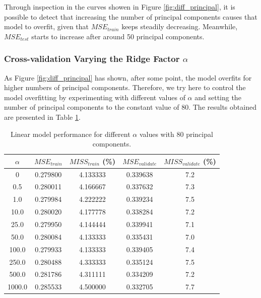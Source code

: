 \documentclass{article}
\begin{document}
Through inspection in the curves showen in Figure \ref{fig:diff_principal}, it is possible to detect that increasing the number of principal components causes that model to overfit, given that $MSE_{train}$ keeps steadily decreasing.  Meanwhile, $MSE_{test}$ starts to increase after around 50 principal components.

\subsubsection{Cross-validation Varying the Ridge Factor $\alpha$}

As Figure \ref{fig:diff_principal} has shown, after some point, the model overfits for higher numbers of principal components. Therefore, we try here to control the model overfitting by experimenting with different values of $\alpha$ and setting the number of principal components to the constant value of 80. The results obtained are presented in Table \ref{table:diff_pc_alpha}.

\begin{table}[h!]
\begin{center}
 \begin{tabular}{||c | c | c | c | c||} 
 \hline
 $\alpha$ & $MSE_{train}$ & $MISS_{train}$ (\%) & $MSE_{validate}$ & $MISS_{validate}$ (\%) \\ [0.5ex]
 \hline\hline
 0 & 0.279800 & 4.133333 & 0.339638 & 7.2\\ 
 \hline
 0.5 & 0.280011 & 4.166667 & 0.337632 & 7.3\\
 \hline
 1.0 & 0.279984 & 4.222222 & 0.339234 & 7.5\\
 \hline
 10.0 & 0.280020 & 4.177778 & 0.338284 & 7.2\\
 \hline
 25.0 & 0.279950 & 4.144444 & 0.339941 & 7.1\\
 \hline
  50.0 & 0.280084 & 4.133333 & 0.335431 & 7.0\\
 \hline
  100.0 & 0.279933 & 4.133333 & 0.339405 & 7.4\\
 \hline
  250.0 & 0.280488 & 4.333333 & 0.335124 & 7.5\\
 \hline
  500.0 & 0.281786 & 4.311111 & 0.334209 & 7.2\\
 \hline
  1000.0 & 0.285533 & 4.500000 & 0.332705 & 7.7\\
 \hline
\end{tabular}
\caption{Linear model performance for different $\alpha$ values with 80 principal components.}
\label{table:diff_pc_alpha}
\end{center}
\end{table}
\end{document}
